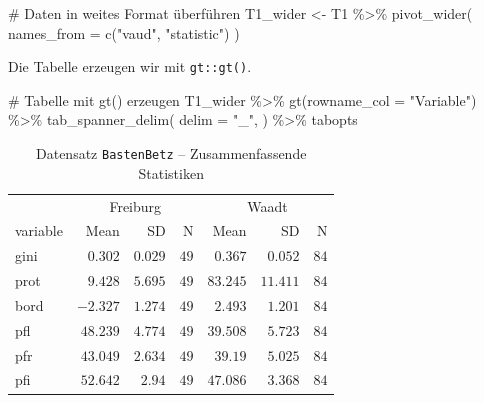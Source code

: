 \documentclass[
  a4paper,
  DIV=11,
  oneside]{scrreprt}
\newenvironment{Shaded}{\begin{snugshade}}{\end{snugshade}}
\newcommand{\AttributeTok}[1]{\textcolor[rgb]{0.40,0.45,0.13}{#1}}
\newcommand{\CommentTok}[1]{\textcolor[rgb]{0.37,0.37,0.37}{#1}}
\newcommand{\FunctionTok}[1]{\textcolor[rgb]{0.28,0.35,0.67}{#1}}
\newcommand{\NormalTok}[1]{\textcolor[rgb]{0.00,0.23,0.31}{#1}}
\newcommand{\OtherTok}[1]{\textcolor[rgb]{0.00,0.23,0.31}{#1}}
\newcommand{\SpecialCharTok}[1]{\textcolor[rgb]{0.37,0.37,0.37}{#1}}
\newcommand{\StringTok}[1]{\textcolor[rgb]{0.13,0.47,0.30}{#1}}
\begin{document}
\begin{Shaded}
\begin{Highlighting}[]
\CommentTok{\# Daten in weites Format überführen}
\NormalTok{T1\_wider }\OtherTok{\textless{}{-}}\NormalTok{ T1 }\SpecialCharTok{\%\textgreater{}\%} 
  \FunctionTok{pivot\_wider}\NormalTok{(}
    \AttributeTok{names\_from =} \FunctionTok{c}\NormalTok{(}\StringTok{"vaud"}\NormalTok{, }\StringTok{"statistic"}\NormalTok{)}
\NormalTok{  )}
\end{Highlighting}
\end{Shaded}

Die Tabelle erzeugen wir mit \texttt{gt::gt()}.

\begin{Shaded}
\begin{Highlighting}[]
\CommentTok{\# Tabelle mit gt() erzeugen}
\NormalTok{T1\_wider }\SpecialCharTok{\%\textgreater{}\%}
  \FunctionTok{gt}\NormalTok{(}\AttributeTok{rowname\_col =} \StringTok{"Variable"}\NormalTok{) }\SpecialCharTok{\%\textgreater{}\%} 
  \FunctionTok{tab\_spanner\_delim}\NormalTok{(}
    \AttributeTok{delim =} \StringTok{"\_"}\NormalTok{,}
\NormalTok{  ) }\SpecialCharTok{\%\textgreater{}\%}
\NormalTok{ tabopts}
\end{Highlighting}
\end{Shaded}

\begin{longtable}{lrrrrrr}

\caption{\label{tbl-sumstat}Datensatz \texttt{BastenBetz} --
Zusammenfassende Statistiken}

\tabularnewline

\toprule
 & \multicolumn{3}{c}{Freiburg} & \multicolumn{3}{c}{Waadt} \\ 
\cmidrule(lr){2-4} \cmidrule(lr){5-7}
variable & Mean & SD & N & Mean & SD & N \\ 
\midrule\addlinespace[2.5pt]
gini & $0.302$ & $0.029$ & $49$ & $0.367$ & $0.052$ & $84$ \\ 
prot & $9.428$ & $5.695$ & $49$ & $83.245$ & $11.411$ & $84$ \\ 
bord & $-2.327$ & $1.274$ & $49$ & $2.493$ & $1.201$ & $84$ \\ 
pfl & $48.239$ & $4.774$ & $49$ & $39.508$ & $5.723$ & $84$ \\ 
pfr & $43.049$ & $2.634$ & $49$ & $39.19$ & $5.025$ & $84$ \\ 
pfi & $52.642$ & $2.94$ & $49$ & $47.086$ & $3.368$ & $84$ \\ 
\bottomrule

\end{longtable}
\end{document}
